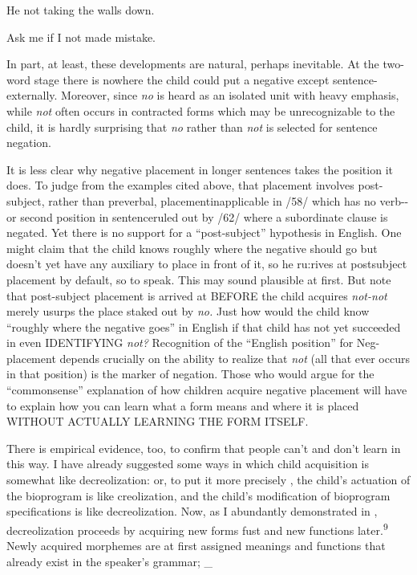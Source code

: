 \ea\label{ex:61}
 He not taking the walls down.
\glt
\z

\ea\label{ex:62}
 Ask me if I not made mistake.
\glt
\z



In part, at least, these developments are natural, perhaps inevit\-able. At the two-word stage there is nowhere the child could put a negative except sentence-externally. Moreover, since \textit{no} is heard as an isolated unit with heavy emphasis, while \textit{not} often occurs in contracted forms which may be unrecognizable to the child, it is hardly surprising that \textit{no} rather than \textit{not} is selected for sentence negation.

It is less clear why negative placement in longer sentences takes the position it does. To judge from the examples cited above, that placement involves post-subject, rather than preverbal, placement\-inapplicable in /58/ which has no verb-{}-or second position in sentence\-ruled out by /62/ where a subordinate clause is negated. Yet there is no support for a ``post-subject'' hypothesis in English. One might claim that the child knows roughly where the negative should go but doesn't yet have any auxiliary to place in front of it, so he ru:rives at post\-subject placement by default, so to speak. This may sound plausible at first. But note that post-subject placement is arrived at BEFORE the child acquires \textit{not-not} merely usurps the place staked out by \textit{no.} Just how would the child know ``roughly where the negative goes'' in English if that child has not yet succeeded in even IDENTIFYING \textit{not?} Recognition of the ``English position'' for Neg-placement depends crucially on the ability to realize that \textit{not} (all that ever occurs in that position) is the marker of negation. Those who would argue for the ``commonsense'' explanation of how children acquire negative place\-ment will have to explain how you can learn what a form means and where it is placed WITHOUT ACTUALLY LEARNING THE FORM ITSELF.

There is empirical evidence, too, to confirm that people can't and don't learn in this way. I have already suggested some ways in which child acquisition is somewhat like decreolization: or, to put it more precisely , the child's actuation of the bioprogram is like creoliza\-tion, and the child's modification of bioprogram specifications is like decreolization. Now, as I abundantly demonstrated in \citet{Bickerton1975}, decreolization proceeds by acquiring new forms fust and new functions later.\textsuperscript{9 }Newly acquired morphemes are at first assigned
meanings and functions that already exist in the speaker's grammar; \_

